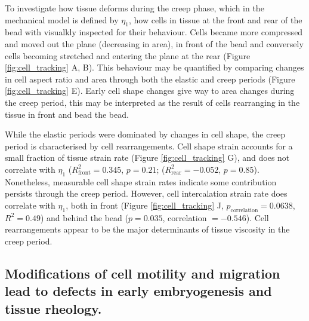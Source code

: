 To investigate how tissue deforms during the creep phase, which in the mechanical model is defined by $\eta_1$,
how cells in tissue  at the front and rear of the bead with visualkly inspected for their behaviour.
Cells became more compressed and moved out the plane (decreasing in area), in front of the bead and conversely cells becoming stretched and entering the plane at the rear (Figure \ref{fig:cell_tracking} A, B).
This behaviour may be quantified by comparing changes in cell aspect ratio and area through both the elastic and creep periods (Figure \ref{fig:cell_tracking} E).
Early cell shape changes give way to area changes during the creep period, this may be interpreted as the result of cells rearranging in the tissue in front and bead the bead.

While the elastic periods were dominated by changes in cell shape, the creep period is characterised by cell rearrangements.
Cell shape strain accounts for a small fraction of tissue strain rate (Figure \ref{fig:cell_tracking} G), and does not correlate with $\eta_1$ ($R_\text{front}^2 = 0.345$, $p = 0.21$; ($R_\text{rear}^2 = -0.052$, $p = 0.85$).
Nonetheless, measurable cell shape strain rates indicate some contribution persists through the creep period.
However, cell intercalation strain rate does correlate with $\eta_1$, both in front (Figure \ref{fig:cell_tracking} J, $p_\text{correlation} = 0.0638$, $R^2 = 0.49$) and behind the bead ($p = 0.035$, correlation $= -0.546$).
Cell rearrangements appear to be the major determinants of tissue viscosity in the creep period.


\subsection{Modifications of cell motility and migration lead to defects in early embryogenesis and tissue rheology.}

